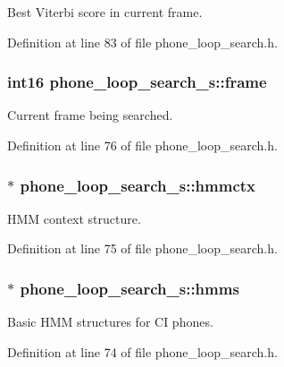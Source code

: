 Best Viterbi score in current frame. 



Definition at line 83 of file phone\+\_\+loop\+\_\+search.\+h.

\subsubsection[{frame}]{\setlength{\rightskip}{0pt plus 5cm}int16 phone\+\_\+loop\+\_\+search\+\_\+s\+::frame}\label{structphone__loop__search__s_a160e5fb9670d1870e5b21379a87bace5}


Current frame being searched. 



Definition at line 76 of file phone\+\_\+loop\+\_\+search.\+h.

\subsubsection[{hmmctx}]{$\ast$ phone\+\_\+loop\+\_\+search\+\_\+s\+::hmmctx}\label{structphone__loop__search__s_a67c44a95de79cb421fbeed4432686f48}


H\+M\+M context structure. 



Definition at line 75 of file phone\+\_\+loop\+\_\+search.\+h.

\subsubsection[{hmms}]{$\ast$ phone\+\_\+loop\+\_\+search\+\_\+s\+::hmms}\label{structphone__loop__search__s_a6f29f6a259a1ee07108bb55036cec9d0}


Basic H\+M\+M structures for C\+I phones. 



Definition at line 74 of file phone\+\_\+loop\+\_\+search.\+h.


